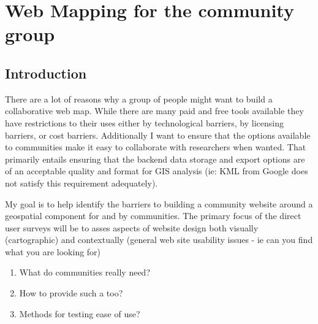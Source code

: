 \documentclass[12pt,letterpaper]{article}
\begin{document}
%

\section{Web Mapping for the community group}
\subsection{Introduction}
	There are a lot of reasons why a group of people might want to build a collaborative web map. While there are many paid and free tools available they have restrictions to their uses either by technological barriers, by licensing barriers, or cost barriers. Additionally I want to ensure that the options available to communities make it easy to collaborate with researchers when wanted. That primarily entails ensuring that the backend data storage and export options are of an acceptable quality and format for GIS analysis (ie: KML from Google does not satisfy this requirement adequately).
	
My goal is to help identify the barriers to building a community website around a geospatial component for and by communities. The primary focus of the direct user surveys will be to asses aspects of website design both visually (cartographic) and contextually (general web site usability issues - ie can you find what you are looking for)
\begin{enumerate}
\item What do communities really need?
\item How to provide such a too?
\item Methods for testing ease of use?
\end{enumerate}
\end{document}
